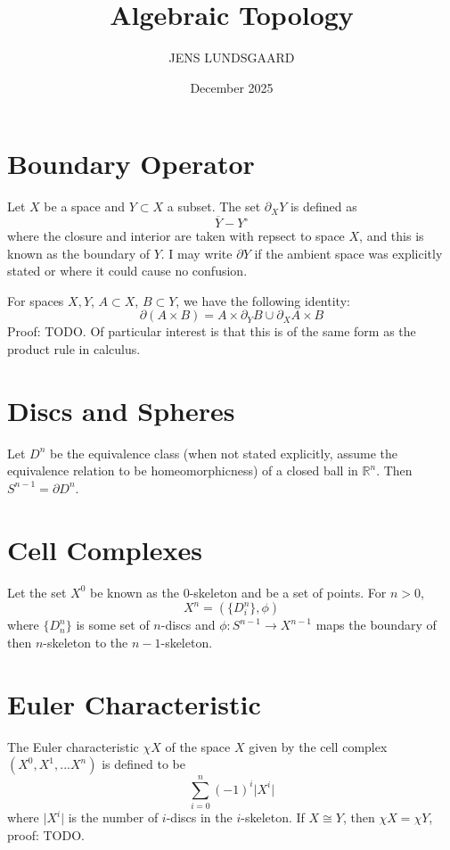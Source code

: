 \documentclass{article}
\title{Algebraic Topology}
\author{JENS LUNDSGAARD}
\date{December 2025}
\begin{document}
\maketitle
\section{Boundary Operator} \label{boundary}
Let $X$ be a space and $Y \subset X$ a subset. The set $\partial_X Y$ is defined as
$$\overline{Y} - Y^\circ$$
where the closure and interior are taken with repsect to space $X$, and this is known as the boundary of $Y$. I may write $\partial Y$ if the ambient space was explicitly stated or where it could cause no confusion.

For spaces $X,Y$, $A \subset X$, $B \subset Y$, we have the following identity:
$$\partial(A \times B) = A \times \partial_Y B \cup \partial_X A \times B$$
Proof: TODO. Of particular interest is that this is of the same form as the product rule in calculus.

\section{Discs and Spheres} \label{discs_spheres}
Let $D^n$ be the equivalence class (when not stated explicitly, assume the equivalence relation to be homeomorphicness) of a closed ball in $\mathbb{R}^n$. Then $S^{n-1} = \partial D^n$.

\section{Cell Complexes} \label{cell_complexes}
Let the set $X^0$ be known as the $0$-skeleton and be a set of points. For $n > 0$,
$$X^n = (\{D_i^n\},\phi)$$
where $\{D_n^n\}$ is some set of $n$-discs and $\phi:S^{n-1} \to X^{n-1}$ maps the boundary of then $n$-skeleton to the $n-1$-skeleton.

\section{Euler Characteristic} \label{euler_characteristic}
The Euler characteristic $\chi X$ of the space $X$ given by the cell complex $(X^0, X^1,...X^n)$ is defined to be
$$\sum_{i=0}^n (-1)^i \vert X^i \vert$$
where $\vert X^i \vert$ is the number of $i$-discs in the $i$-skeleton. If $X \cong Y$, then $\chi X = \chi Y$, proof: TODO.
\end{document}
